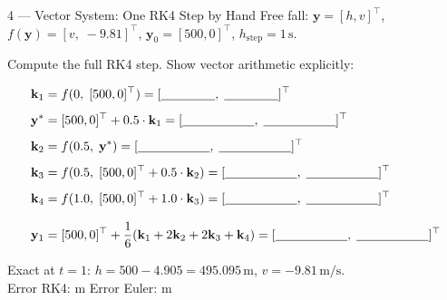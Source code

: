 \documentclass[12pt, a4paper]{article}
\begin{document}
\begin{solutionspace}[7cm]
\end{solutionspace}

\begin{exercisebox}{4 — Vector System: One RK4 Step by Hand}
Free fall: $\mathbf{y} = [h, v]^\top$, $f(\mathbf{y}) = [v,\; -9.81]^\top$, $\mathbf{y}_0 = [500, 0]^\top$, $h_\text{step}=1\,\text{s}$.

Compute the full RK4 step. Show vector arithmetic explicitly:

\begin{align*}
\mathbf{k}_1 &= f(0,\; [500, 0]^\top) = [\underline{\hspace{1.5cm}},\; \underline{\hspace{1.5cm}}]^\top \\[0.4em]
\mathbf{y}^* &= [500,0]^\top + 0.5\cdot\mathbf{k}_1 = [\underline{\hspace{2cm}},\; \underline{\hspace{2cm}}]^\top \\[0.4em]
\mathbf{k}_2 &= f(0.5,\; \mathbf{y}^*) = [\underline{\hspace{2cm}},\; \underline{\hspace{2cm}}]^\top \\[0.4em]
\mathbf{k}_3 &= f(0.5,\; [500,0]^\top + 0.5\cdot\mathbf{k}_2) = [\underline{\hspace{2cm}},\; \underline{\hspace{2cm}}]^\top \\[0.4em]
\mathbf{k}_4 &= f(1.0,\; [500,0]^\top + 1.0\cdot\mathbf{k}_3) = [\underline{\hspace{2cm}},\; \underline{\hspace{2cm}}]^\top \\[0.8em]
\mathbf{y}_1 &= [500,0]^\top + \frac{1}{6}(\mathbf{k}_1 + 2\mathbf{k}_2 + 2\mathbf{k}_3 + \mathbf{k}_4)
= [\underline{\hspace{2cm}},\; \underline{\hspace{2cm}}]^\top
\end{align*}

Exact at $t=1$: $h = 500 - 4.905 = 495.095\,\text{m}$, $v = -9.81\,\text{m/s}$.\\
Error RK4: \underline{\hspace{2cm}}m \quad Error Euler: \underline{\hspace{2cm}}m
\end{exercisebox}

\begin{solutionspace}[6cm]
\end{solutionspace}
\end{document}
